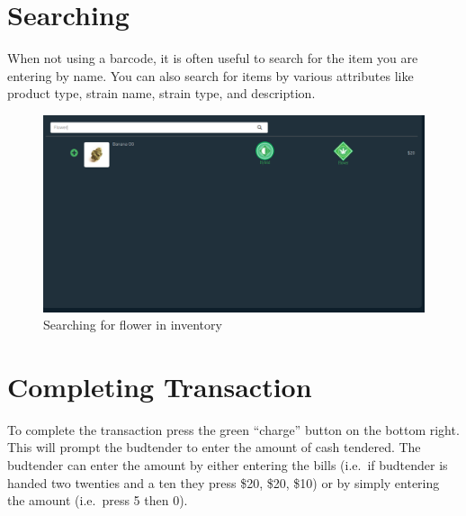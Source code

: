 \documentclass[]{book}
\theoremstyle{definition}
\theoremstyle{definition}
\theoremstyle{definition}
\theoremstyle{remark}
\begin{document}
\section{Searching}\label{searching}

When not using a barcode, it is often useful to search for the item you
are entering by name. You can also search for items by various
attributes like product type, strain name, strain type, and description.

\begin{figure}
\centering
\includegraphics{images/P8.png}
\caption{Searching for flower in inventory}
\end{figure}

\section{Completing Transaction}\label{completing-transaction}

To complete the transaction press the green ``charge'' button on the
bottom right. This will prompt the budtender to enter the amount of cash
tendered. The budtender can enter the amount by either entering the
bills (i.e.~if budtender is handed two twenties and a ten they press
\$20, \$20, \$10) or by simply entering the amount (i.e.~press 5 then
0).
\end{document}
